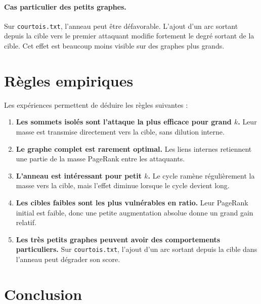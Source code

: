 \documentclass[12pt,a4paper]{article}
\theoremstyle{definition}
\begin{document}
\paragraph{Cas particulier des petits graphes.}
Sur \texttt{courtois.txt}, l'anneau peut être défavorable. L'ajout d'un arc
sortant depuis la cible vers le premier attaquant modifie fortement le degré
sortant de la cible. Cet effet est beaucoup moins visible sur des graphes plus
grands.

\section{Règles empiriques}

Les expériences permettent de déduire les règles suivantes :

\begin{enumerate}
    \item \textbf{Les sommets isolés sont l'attaque la plus efficace pour grand $k$.}
    Leur masse est transmise directement vers la cible, sans dilution interne.

    \item \textbf{Le graphe complet est rarement optimal.}
    Les liens internes retiennent une partie de la masse PageRank entre les
    attaquants.

    \item \textbf{L'anneau est intéressant pour petit $k$.}
    Le cycle ramène régulièrement la masse vers la cible, mais l'effet diminue
    lorsque le cycle devient long.

    \item \textbf{Les cibles faibles sont les plus vulnérables en ratio.}
    Leur PageRank initial est faible, donc une petite augmentation absolue donne
    un grand gain relatif.

    \item \textbf{Les très petits graphes peuvent avoir des comportements
    particuliers.}
    Sur \texttt{courtois.txt}, l'ajout d'un arc sortant depuis la cible dans
    l'anneau peut dégrader son score.
\end{enumerate}

\section{Conclusion}
\end{document}

